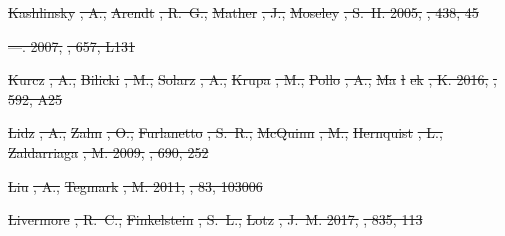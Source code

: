 \documentclass[numberedappendix]{emulateapj}
\providecommand{\DIFdel}[1]{{\protect\color{red}\sout{#1}}}                      %
\begin{document}
\DIFdel{Kashlinsky}%
\DIFdel{, A., }%
\DIFdel{Arendt}%
\DIFdel{, R.~G., }%
\DIFdel{Mather}%
\DIFdel{, J., }%
\DIFdel{Moseley}%
\DIFdel{, S.~H. 2005,
  }%
\DIFdel{, 438, 45
}%

\DIFdel{---. 2007, }%
\DIFdel{, 657, L131
}%

\DIFdel{Kurcz}%
\DIFdel{, A., }%
\DIFdel{Bilicki}%
\DIFdel{, M., }%
\DIFdel{Solarz}%
\DIFdel{, A., }%
\DIFdel{Krupa}%
\DIFdel{, M., }%
\DIFdel{Pollo}%
\DIFdel{, A., }%
\DIFdel{Ma}%
\DIFdel{\l}%
\DIFdel{ek}%
\DIFdel{, K. 2016, }%
\DIFdel{, 592, A25
}%

\DIFdel{Lidz}%
\DIFdel{, A., }%
\DIFdel{Zahn}%
\DIFdel{, O., }%
\DIFdel{Furlanetto}%
\DIFdel{, S.~R., }%
\DIFdel{McQuinn}%
\DIFdel{, M., }%
\DIFdel{Hernquist}%
\DIFdel{, L., }%
\DIFdel{Zaldarriaga}%
\DIFdel{, M. 2009, }%
\DIFdel{, 690, 252
}%

\DIFdel{Liu}%
\DIFdel{, A., }%
\DIFdel{Tegmark}%
\DIFdel{, M. 2011, }%
\DIFdel{, 83, 103006
}%

\DIFdel{Livermore}%
\DIFdel{, R.~C., }%
\DIFdel{Finkelstein}%
\DIFdel{, S.~L., }%
\DIFdel{Lotz}%
\DIFdel{, J.~M. 2017, }%
\DIFdel{, 835, 113
}%
\end{document}
